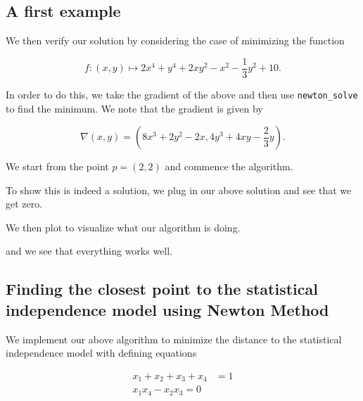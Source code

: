 \documentclass[11pt]{article}
\begin{document}

    
\subsection{A first example}

    We then verify our solution by considering the case of minimizing the
function

\begin{equation}
    f : (x, y) \mapsto 2x^4 + y^4 + 2xy^2 - x^2 - \frac{1}{3}y^2 + 10. 
\end{equation}

In order to do this, we take the gradient of the above and then use
\texttt{newton\_solve} to find the minimum. We note that the gradient is
given by

\begin{equation}
    \nabla (x, y) = (8x^3 + 2y^2 - 2x, 4y^3 + 4xy - \frac{2}{3}y). 
\end{equation}

We start from the point $p = (2, 2)$ and commence the algorithm.


        
    To show this is indeed a solution, we plug in our above solution and see
that we get zero.



We then plot to visualize what our algorithm is doing. 
        

    
and we see that everything works well. 

    \hypertarget{finding-the-closest-point-to-the-statistical-independence-model-using-newton-method}{%
\subsection{Finding the closest point to the statistical independence
model using Newton
Method}\label{finding-the-closest-point-to-the-statistical-independence-model-using-newton-method}}

We implement our above algorithm to minimize the distance to the statistical
independence model with defining equations

\begin{equation}
\begin{split}
x_1 + x_2 + x_3 + x_4 & = 1 \\
x_1 x_4 - x_2 x_3 = 0
\end{split}
\end{equation}
\end{document}
